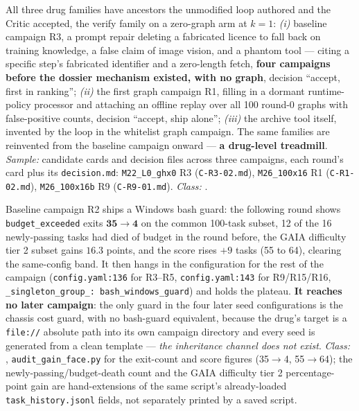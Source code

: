 \begin{description}[leftmargin=0pt,labelindent=0pt,labelsep=0pt,style=nextline,font=\normalfont,itemsep=6pt]
\item[\textbf{F38}\quad Prescription archaeology --- the reversal.]
All three drug families have ancestors the unmodified loop authored and the
Critic accepted, the verify family on a zero-graph arm at $k{=}1$:
\emph{(i)} baseline campaign R3, a prompt repair deleting a fabricated
licence to fall back on training knowledge, a false claim of image
vision, and a phantom tool --- citing a specific step's fabricated
identifier and a zero-length fetch, \textbf{four campaigns before the
dossier mechanism existed, with no graph}, decision ``accept, first in
ranking''; \emph{(ii)} the first graph campaign R1, filling in a dormant
runtime-policy processor and attaching an offline replay over all 100
round-0 graphs with false-positive counts, decision ``accept, ship alone'';
\emph{(iii)} the archive tool itself, invented by the loop in the whitelist
graph campaign. The same families are reinvented from the baseline campaign
onward --- \textbf{a drug-level treadmill}. \emph{Sample:} candidate cards
and decision files across three campaigns, each round's card plus its
\texttt{decision.md}: \texttt{M22\_L0\_ghx0} R3 (\texttt{C-R3-02.md}),
\texttt{M26\_100x16} R1 (\texttt{C-R1-02.md}), \texttt{M26\_100x16b} R9
(\texttt{C-R9-01.md}). \emph{Class:} .

\item[\textbf{F39}\quad The one drug with a readable effect, and its
      lifetime.]
Baseline campaign R2 ships a Windows bash guard: the following round shows
\texttt{budget\_\allowbreak exceeded} exits $\mathbf{35 \to 4}$ on the common
100-task subset, 12 of the 16 newly-passing tasks had died of budget in
the round before, the GAIA difficulty tier 2 subset gains $16.3$ points, and the score
rises $+9$ tasks (55 to 64), clearing the
same-config band. It then hangs in the configuration for the rest of the
campaign (\texttt{config.yaml:136} for R3--R5, \texttt{config.yaml:143}
for R9/R15/R16,
\texttt{\_singleton\_group\_: bash\_windows\_guard}) and holds the plateau.
\textbf{It reaches no later campaign}: the only guard in the four later
seed configurations is the chassis cost guard, with no bash-guard
equivalent, because the drug's target is a \texttt{file://} absolute path
into its own campaign directory and every seed is generated from a clean
template --- \emph{the inheritance channel does not exist}.
\emph{Class:} , \texttt{audit\_gain\_face.py} for the exit-count
and score figures (35$\to$4, 55$\to$64); the newly-passing/budget-death
count and the GAIA difficulty tier 2 percentage-point gain are hand-extensions of the
same script's already-loaded \texttt{task\_history.jsonl} fields, not
separately printed by a saved script.


\end{description}
